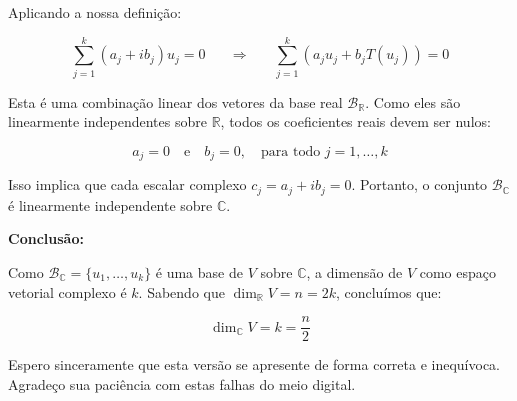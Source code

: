 Aplicando a nossa definição:

\[
\sum_{j=1}^{k} (a_{j} + ib_{j})u_{j} = 0 \;\;\;\;\;\; \Longrightarrow \;\;\;\;\;\; \sum_{j=1}^{k} (a_{j}u_{j} + b_{j}T(u_{j})) = 0
\]

Esta é uma combinação linear dos vetores da base real $\mathcal{B}_{\mathbb{R}}$. Como eles são linearmente independentes sobre $\mathbb{R}$, todos os coeficientes reais devem ser nulos:

\[
a_{j} = 0 \quad \text{e} \quad b_{j} = 0, \quad \text{para todo } j = 1, \ldots, k
\]

Isso implica que cada escalar complexo $c_{j} = a_{j} + ib_{j} = 0$. Portanto, o conjunto $\mathcal{B}_{\mathbb{C}}$ é linearmente independente sobre $\mathbb{C}$.

\textbf{Conclusão:}

Como $\mathcal{B}_{\mathbb{C}} = \{u_{1}, \ldots, u_{k}\}$ é uma base de $V$ sobre $\mathbb{C}$, a dimensão de $V$ como espaço vetorial complexo é $k$. Sabendo que $\dim_{\mathbb{R}} V = n = 2k$, concluímos que:

\[
\dim_{\mathbb{C}} V = k = \frac{n}{2}
\]

Espero sinceramente que esta versão se apresente de forma correta e inequívoca. Agradeço sua paciência com estas falhas do meio digital.